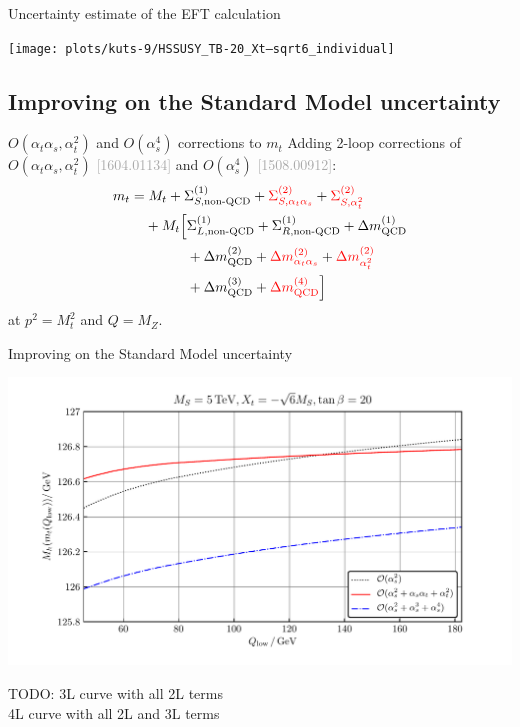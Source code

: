 \documentclass[hyperref={pdfpagelabels=false},ngerman]{beamer}
\newcommand{\bigcite}[1]{\textcolor{darkgray}{[#1]}}
\newcommand{\at}{\alpha_t}
\newcommand{\as}{\alpha_s}
\begin{document}
\begin{frame}{Uncertainty estimate of the EFT calculation}
  \begin{center}
    \texttt{[image: plots/kuts-9/HSSUSY\_TB-20\_Xt--sqrt6\_individual]}
  \end{center}
\end{frame}

\subsection{Improving on the Standard Model uncertainty}

\begin{frame}{$O(\at\as, \at^2)$ and $O(\as^4)$ corrections to $m_t$}
  Adding 2-loop corrections of $O(\at\as, \at^2)$ \bigcite{1604.01134}
  and $O(\as^4)$ \bigcite{1508.00912}:
\begin{align*}
  m_t &= M_t
  + \Sigma_{S,\text{non-QCD}}^{(1)}
  + \textcolor{red}{\Sigma_{S,\at\as}^{(2)}}
  + \textcolor{red}{\Sigma_{S,\at^2}^{(2)}} \\
  &\phantom{={}} + M_t \Big[ \Sigma_{L,\text{non-QCD}}^{(1)} + \Sigma_{R,\text{non-QCD}}^{(1)}
    + \Delta m_{\text{QCD}}^{(1)} \\
  &\phantom{={} + M_t \Big[}
    + \Delta m_{\text{QCD}}^{(2)}
    + \textcolor{red}{\Delta m_{\at\as}^{(2)}}
    + \textcolor{red}{\Delta m_{\at^2}^{(2)}} \\
  &\phantom{={} + M_t \Big[}
    + \Delta m_{\text{QCD}}^{(3)}
    + \textcolor{red}{\Delta m_{\text{QCD}}^{(4)}}
  \Big]
\end{align*}
at $p^2 = M_t^2$ and  $Q = M_Z$.
\end{frame}

\begin{frame}{Improving on the Standard Model uncertainty}
  \begin{center}
    \includegraphics[width=\textwidth]{plots/kuts-10/Mh_Qlow_mt2Lvsmt3L4LQCD}
  \end{center}
  TODO: 3L curve with all 2L terms\\
  4L curve with all 2L and 3L terms
\end{frame}
\end{document}
